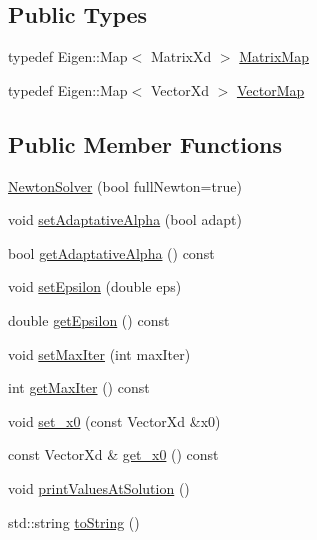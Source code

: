 \subsection*{Public Types}
\begin{DoxyCompactItemize}
\item 
typedef Eigen\+::\+Map$<$ Matrix\+Xd $>$ \hyperlink{classocra_1_1NewtonSolver_a53e3463c336170efa3819d725c9b16e3}{Matrix\+Map}
\item 
typedef Eigen\+::\+Map$<$ Vector\+Xd $>$ \hyperlink{classocra_1_1NewtonSolver_aad21c090baadce638c9613f4b9d1d5c4}{Vector\+Map}
\end{DoxyCompactItemize}
\subsection*{Public Member Functions}
\begin{DoxyCompactItemize}
\item 
\hyperlink{classocra_1_1NewtonSolver_ab66a0ba4ef83a14fd2c7b39c2bae78b9}{Newton\+Solver} (bool full\+Newton=true)
\item 
void \hyperlink{classocra_1_1NewtonSolver_ade438475c7a8ffdc2bb60097639b8e27}{set\+Adaptative\+Alpha} (bool adapt)
\item 
bool \hyperlink{classocra_1_1NewtonSolver_a0d68afaf41cfb76dd495ed75b3fc988f}{get\+Adaptative\+Alpha} () const 
\item 
void \hyperlink{classocra_1_1NewtonSolver_ac128bd9e9d7c05ae3e91bddb362e7165}{set\+Epsilon} (double eps)
\item 
double \hyperlink{classocra_1_1NewtonSolver_ab5c33ed905e408b70502fbbe0e0f600d}{get\+Epsilon} () const 
\item 
void \hyperlink{classocra_1_1NewtonSolver_a7bea41cafca30faf5dca35a7e3bd8a2e}{set\+Max\+Iter} (int max\+Iter)
\item 
int \hyperlink{classocra_1_1NewtonSolver_a6d013949516a9398849ccaf5ce95b9af}{get\+Max\+Iter} () const 
\item 
void \hyperlink{classocra_1_1NewtonSolver_a4fc7eba127f6975a0e8947f39d24629a}{set\+\_\+x0} (const Vector\+Xd \&x0)
\item 
const Vector\+Xd \& \hyperlink{classocra_1_1NewtonSolver_a16404658d85944f02429427107acbc04}{get\+\_\+x0} () const 
\item 
void \hyperlink{classocra_1_1NewtonSolver_a92d33f1dfe684de2051d0389816cf9a5}{print\+Values\+At\+Solution} ()
\item 
std\+::string \hyperlink{classocra_1_1NewtonSolver_a3d498cc7771cf3cf733552a35fd77006}{to\+String} ()
\end{DoxyCompactItemize}
